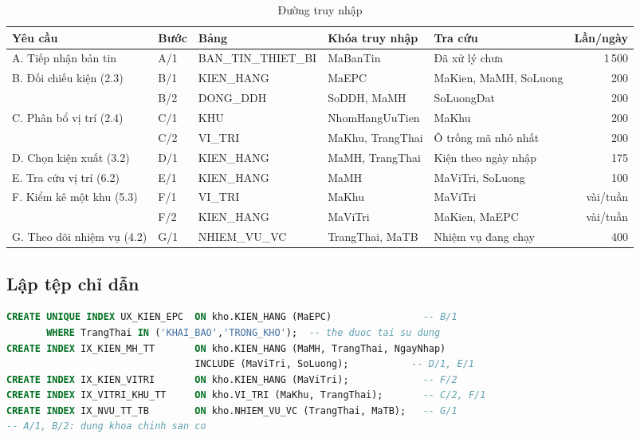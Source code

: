 \begin{table}[H]
\centering
\caption{Đường truy nhập}
\label{tab:duongtruy}
\footnotesize
\begin{tabularx}{\textwidth}{L{2.7cm} l L{3.25cm} L{2.6cm} Y r}
\toprule
\textbf{Yêu cầu} & \textbf{Bước} & \textbf{Bảng} & \textbf{Khóa truy nhập} & \textbf{Tra cứu} & \textbf{Lần/ngày} \\
\midrule
A. Tiếp nhận bản tin & A/1 & BAN\_TIN\_THIET\_BI & MaBanTin & Đã xử lý chưa & 1\,500 \\
B. Đối chiếu kiện (2.3) & B/1 & KIEN\_HANG & MaEPC & MaKien, MaMH, SoLuong & 200 \\
 & B/2 & DONG\_DDH & SoDDH, MaMH & SoLuongDat & 200 \\
C. Phân bổ vị trí (2.4) & C/1 & KHU & NhomHangUuTien & MaKhu & 200 \\
 & C/2 & VI\_TRI & MaKhu, TrangThai & Ô trống mã nhỏ nhất & 200 \\
D. Chọn kiện xuất (3.2) & D/1 & KIEN\_HANG & MaMH, TrangThai & Kiện theo ngày nhập & 175 \\
E. Tra cứu vị trí (6.2) & E/1 & KIEN\_HANG & MaMH & MaViTri, SoLuong & 100 \\
F. Kiểm kê một khu (5.3) & F/1 & VI\_TRI & MaKhu & MaViTri & vài/tuần \\
 & F/2 & KIEN\_HANG & MaViTri & MaKien, MaEPC & vài/tuần \\
G. Theo dõi nhiệm vụ (4.2) & G/1 & NHIEM\_VU\_VC & TrangThai, MaTB & Nhiệm vụ đang chạy & 400 \\
\bottomrule
\end{tabularx}
\end{table}

\subsection{Lập tệp chỉ dẫn}

\begin{lstlisting}[language=SQL]
CREATE UNIQUE INDEX UX_KIEN_EPC  ON kho.KIEN_HANG (MaEPC)                -- B/1
       WHERE TrangThai IN ('KHAI_BAO','TRONG_KHO');  -- the duoc tai su dung
CREATE INDEX IX_KIEN_MH_TT       ON kho.KIEN_HANG (MaMH, TrangThai, NgayNhap)
                                 INCLUDE (MaViTri, SoLuong);           -- D/1, E/1
CREATE INDEX IX_KIEN_VITRI       ON kho.KIEN_HANG (MaViTri);             -- F/2
CREATE INDEX IX_VITRI_KHU_TT     ON kho.VI_TRI (MaKhu, TrangThai);       -- C/2, F/1
CREATE INDEX IX_NVU_TT_TB        ON kho.NHIEM_VU_VC (TrangThai, MaTB);   -- G/1
-- A/1, B/2: dung khoa chinh san co
\end{lstlisting}

